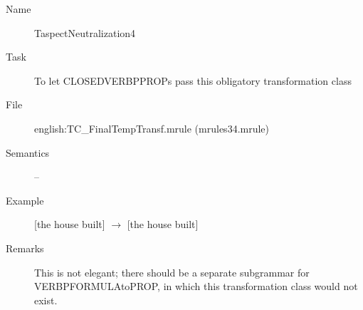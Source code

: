\begin{description}
\vspace{1 cm}
\begin{description}
\item[Name] TaspectNeutralization4
\item[Task] To let CLOSEDVERBPPROPs pass this obligatory transformation class
\item[File] english:TC\_FinalTempTransf.mrule (mrules34.mrule)
\item[Semantics] --
\item[Example] [the house built] $\rightarrow$ [the house built]
\item[Remarks] This is not elegant; there should be a separate subgrammar for 
VERBPFORMULAtoPROP, in which this transformation class would not 
exist. 
\end{description}

\end{description}

\newpage
